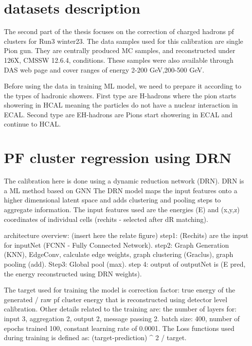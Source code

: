 \section{datasets description}

The second part of the thesis focuses on the correction of charged hadrons pf clusters for Run3 winter23. The data samples used for this calibration are single Pion gun. They are centrally produced MC samples, and reconstructed under 126X, CMSSW 12.6.4, conditions. These samples were also available through DAS web page and cover ranges of energy 2-200 GeV,200-500 GeV.

Before using the data in training ML model, we need to prepare it according to the types of hadronic showers. First type are H-hadrons where the pion starts showering in HCAL meaning the particles do not have a nuclear interaction in ECAL. Second type are EH-hadrons are Pions start showering in ECAL and continue to HCAL.  

\section{PF cluster regression using DRN}

The calibration here is done using a dynamic reduction network (DRN). DRN is a ML method based on GNN %
The DRN model maps the input features onto a higher dimensional latent space and adds clustering and pooling steps to aggregate information. The input features used are the energies (E) and (x,y,z) coordinates of individual cells (rechits - selected after dR matching).

architecture overview: (insert here the relate figure) 
step1: (Rechits) are the input for inputNet (FCNN - Fully Connected Network). 
step2:  Graph Generation (KNN), EdgeConv, calculate edge weights, graph clustering (Graclus), graph pooling (add). 
Step3: Global pool (max).  
step 4: output of outputNet is (E pred, the energy reconstructed using DRN weights).

The target used for training the model is correction factor:  true energy of the generated / raw pf cluster energy that is reconstructed using detector level calibration. Other details related to the training are: the number of layers for: input 3, aggregation 2, output 2, message passing 2. batch size: 400, number of epochs trained 100, constant learning rate of 0.0001. The Loss functions used during training is defined as: (target-prediction) ^ 2 / target.

